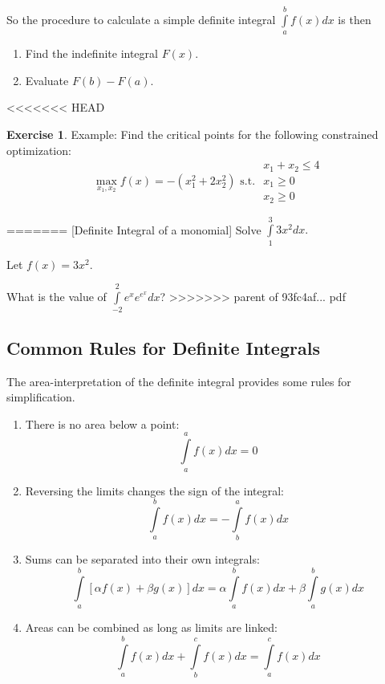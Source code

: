 \documentclass[]{book}
\providecommand{\tightlist}{%
  \setlength{\itemsep}{0pt}\setlength{\parskip}{0pt}}
\theoremstyle{definition}
\theoremstyle{definition}
\theoremstyle{definition}
\newtheorem{exercise}{Exercise}[chapter]
\theoremstyle{remark}
\begin{document}
So the procedure to calculate a simple definite integral \(\int\limits_a^b f(x)dx\) is then

\begin{enumerate}
\def\labelenumi{\arabic{enumi}.}
\tightlist
\item
  Find the indefinite integral \(F(x)\).
\item
  Evaluate \(F(b)-F(a)\).
\end{enumerate}

<<<<<<< HEAD
\begin{exercise}
\protect\hypertarget{exr:unnamed-chunk-62}{}{\label{exr:unnamed-chunk-62} }Example: Find the critical points for the following constrained optimization:
\[\max_{x_1,x_2} f(x) = -(x_1^2 + 2x_2^2) \text{ s.t. } 
\begin{array}{l}
x_1 + x_2 \le 4\\
x_1 \ge 0\\
x_2 \ge 0
\end{array}\]
\end{exercise}
=======
[Definite Integral of a monomial]
\protect\hypertarget{exm:defintmon}{}{\label{exm:defintmon} {} }Solve \(\int\limits_1^3 3x^2 dx.\)

Let \(f(x) = 3x^2\).

\protect\hypertarget{exr:unnamed-chunk-29}{}{\label{exr:unnamed-chunk-29} }What is the value of \(\int\limits_{-2}^2 e^x e^{e^x} dx\)?
>>>>>>> parent of 93fc4af... pdf

\hypertarget{common-rules-for-definite-integrals}{%
\subsection*{Common Rules for Definite Integrals}\label{common-rules-for-definite-integrals}}

The area-interpretation of the definite integral provides some rules for simplification.

\begin{enumerate}
\def\labelenumi{\arabic{enumi}.}
\tightlist
\item
  There is no area below a point: \[\int\limits_a^a f(x)dx=0\]
\item
  Reversing the limits changes the sign of the integral: \[\int\limits_a^b f(x)dx=-\int\limits_b^a f(x)dx\]
\item
  Sums can be separated into their own integrals: \[\int\limits_a^b [\alpha f(x)+\beta g(x)]dx = \alpha \int\limits_a^b f(x)dx + \beta \int\limits_a^b g(x)dx\]
\item
  Areas can be combined as long as limits are linked: \[\int\limits_a^b f(x) dx +\int\limits_b^c f(x)dx = \int\limits_a^c f(x)dx\]
\end{enumerate}
\end{document}
